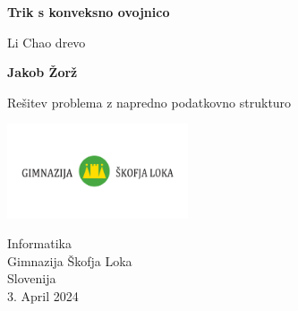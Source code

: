 \documentclass[a4paper]{article}
\begin{document}
    \begin{titlepage}
    \begin{center}
       \vspace*{1cm}

       \textbf{Trik s konveksno ovojnico}

       \vspace{0.5cm}
       Li Chao drevo
       \vspace{1.5cm}

       \textbf{Jakob Žorž}

       \vfill

       Rešitev problema z napredno podatkovno strukturo

       \vspace{0.8cm}

       \includegraphics[width=0.4\textwidth]{gimnazija}

       Informatika\\
       Gimnazija Škofja Loka\\
       Slovenija\\
       3. April 2024

    \end{center}
    \end{titlepage}

    
    
    
    
\end{document}
